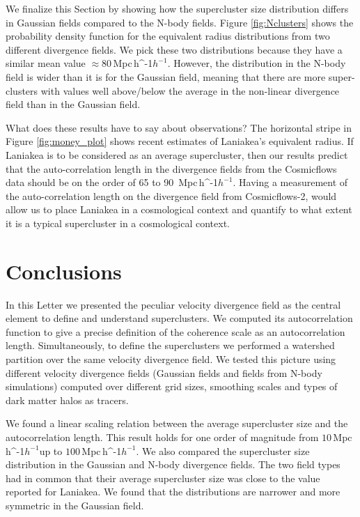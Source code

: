 \documentclass[usenatbib]{mnras}
\newcommand{\Mpch}{\,{\rm Mpc}\,\ifmmode h^{-1}\else $h^{-1}$\fi}
\begin{document}
We finalize this Section by showing how the supercluster size distribution differs in Gaussian fields compared to the N-body fields.
Figure \ref{fig:Nclusters} shows the probability density function for the equivalent radius distributions from two different divergence fields.
We pick these two distributions because they have a similar mean value $\approx80$\Mpch. 
However, the distribution in the N-body field is wider than it is for the Gaussian field, meaning that there are more super-clusters with values well above/below the average in the non-linear divergence field than in the Gaussian field. 


What does these results have to say about observations?
The horizontal stripe in Figure \ref{fig:money_plot} shows recent estimates of Laniakea's equivalent radius. 
If Laniakea is to be considered as an average supercluster, then our results predict that the auto-correlation length in the divergence fields from the Cosmicflows data should be on the order of 65 to 90 \Mpch.
Having a measurement of the auto-correlation length on the divergence field from Cosmicflows-2, would allow us to place Laniakea in a cosmological context and quantify to what extent it is a typical supercluster in a cosmological context.
 



\section{Conclusions}
\label{sec:conclusion}


In this Letter we presented the peculiar velocity divergence field as the central element to define and understand superclusters.
We computed its autocorrelation function to give a precise definition of the coherence scale as an autocorrelation length. 
Simultaneously, to define the superclusters we performed a watershed partition over the same velocity divergence field. 
We tested this picture using different velocity divergence fields (Gaussian fields and fields from N-body simulations) computed over different grid sizes, smoothing scales and types of dark matter halos as tracers.

We found a linear scaling relation between the average supercluster size and the autocorrelation length. 
This result holds for one order of magnitude from $10$\Mpch up to $100$\Mpch.
We also compared the supercluster size distribution in the Gaussian and N-body divergence fields. The two  field types had in common that their average supercluster size was close to the value reported for Laniakea.
We found that the distributions are narrower and more symmetric in the Gaussian field.
\end{document}
